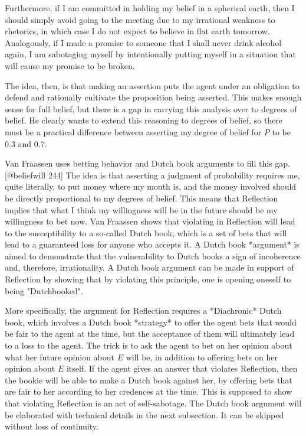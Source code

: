 Furthermore, if I am committed in holding my belief in a spherical
earth, then I should simply avoid going to the meeting due to my
irrational weakness to rhetorics, in which case I do not expect to
believe in flat earth tomorrow. Analogously, if I made a promise to
someone that I shall never drink alcohol again, I am sabotaging myself
by intentionally putting myself in a situation that will cause my
promise to be broken.

The idea, then, is that making an assertion puts the agent under an
obligation to defend and rationally cultivate the proposition being
asserted. This makes enough sense for full belief, but there is a gap in
carrying this analysis over to degrees of belief. He clearly wants to
extend this reasoning to degrees of belief, so there must be a practical
difference between asserting my degree of belief for \(P\) to be 0.3 and
0.7.

Van Fraassen uses betting behavior and Dutch book arguments to fill this
gap.{[}@beliefwill 244{]} The idea is that asserting a judgment of
probability requires me, quite literally, to put money where my mouth
is, and the money involved should be directly proportional to my degrees
of belief. This means that Reflection implies that what I think my
willingness will be in the future should be my willingness to bet now.
Van Fraassen shows that violating in Reflection will lead to the
susceptibility to a so-called Dutch book, which is a set of bets that
will lead to a guaranteed loss for anyone who accepts it. A Dutch book
*argument* is aimed to demonstrate that the vulnerability to Dutch books
a sign of incoherence and, therefore, irrationality. A Dutch book
argument can be made in support of Reflection by showing that by
violating this principle, one is opening oneself to being "Dutchbooked".

More specifically, the argument for Reflection requires a *Diachronic*
Dutch book, which involves a Dutch book *strategy* to offer the agent
bets that would be fair to the agent at the time, but the acceptance of
them will ultimately lead to a loss to the agent. The trick is to ask
the agent to bet on her opinion about what her future opinion about
\(E\) will be, in addition to offering bets on her opinion about \(E\)
itself. If the agent gives an answer that violates Reflection, then the
bookie will be able to make a Dutch book against her, by offering bets
that are fair to her according to her credences at the time. This is
supposed to show that violating Reflection is an act of self-sabotage.
The Dutch book argument will be elaborated with technical details in the
next subsection. It can be skipped without loss of continuity.


